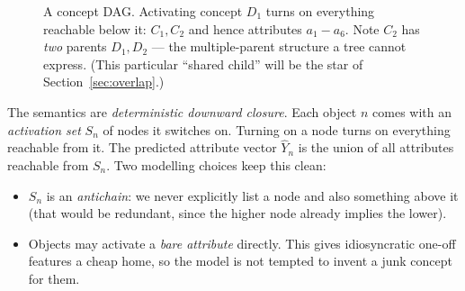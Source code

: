 \documentclass[11pt]{article}
\newcommand{\Yhat}{\hat{Y}}
\begin{document}
\begin{figure}[h]
\centering
{}
\caption{A concept DAG. Activating concept $D_1$ turns on everything reachable
below it: $C_1,C_2$ and hence attributes $a_1\!-\!a_6$. Note $C_2$ has
\emph{two} parents $D_1,D_2$ --- the multiple-parent structure a tree cannot
express. (This particular ``shared child'' will be the star of
Section~\ref{sec:overlap}.)}
\label{fig:dag}
\end{figure}

The semantics are \emph{deterministic downward closure}. Each object $n$ comes
with an \emph{activation set} $S_n$ of nodes it switches on. Turning on a node
turns on everything reachable from it. The predicted attribute vector $\Yhat_n$
is the union of all attributes reachable from $S_n$. Two modelling choices keep
this clean:
\begin{itemize}
  \item $S_n$ is an \emph{antichain}: we never explicitly list a node and also
        something above it (that would be redundant, since the higher node
        already implies the lower).
  \item Objects may activate a \emph{bare attribute} directly. This gives
        idiosyncratic one-off features a cheap home, so the model is not tempted
        to invent a junk concept for them.
\end{itemize}
\end{document}
